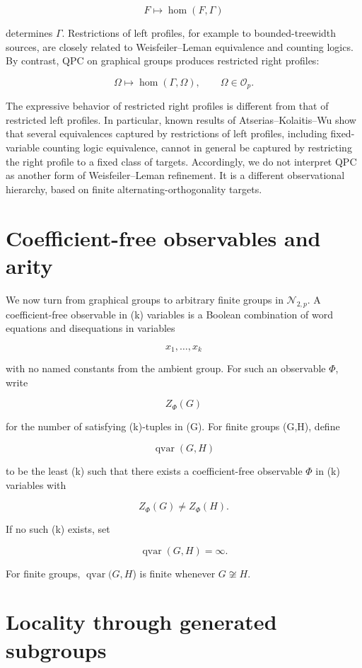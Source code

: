 \documentclass[11pt]{article}
\begin{document}
\[
F\mapsto \operatorname{hom}(F,\Gamma)
\]

determines $\Gamma$. Restrictions of left profiles, for example to bounded-treewidth sources, are closely related to Weisfeiler--Leman equivalence and counting logics. By contrast, QPC on graphical groups produces restricted right profiles:

\[
\Omega\mapsto \operatorname{hom}(\Gamma,\Omega),
\qquad
\Omega\in\mathcal O_p.
\]

The expressive behavior of restricted right profiles is different from that of restricted left profiles. In particular, known results of Atserias--Kolaitis--Wu show that several equivalences captured by restrictions of left profiles, including fixed-variable counting logic equivalence, cannot in general be captured by restricting the right profile to a fixed class of targets. Accordingly, we do not interpret QPC as another form of Weisfeiler--Leman refinement. It is a different observational hierarchy, based on finite alternating-orthogonality targets.

\section{Coefficient-free observables and arity}

We now turn from graphical groups to arbitrary finite groups in $\mathcal N_{2,p}$. A coefficient-free observable in (k) variables is a Boolean combination of word equations and disequations in variables

\[
x_1,\dots,x_k
\]

with no named constants from the ambient group. For such an observable $\Phi$, write

\[
Z_\Phi(G)
\]

for the number of satisfying (k)-tuples in (G). For finite groups (G,H), define

\[
\operatorname{qvar}(G,H)
\]

to be the least (k) such that there exists a coefficient-free observable $\Phi$ in (k) variables with

\[
Z_\Phi(G)\ne Z_\Phi(H).
\]

If no such (k) exists, set

\[
\operatorname{qvar}(G,H)=\infty.
\]

For finite groups, $\operatorname{qvar}(G,H$) is finite whenever $G\not\cong H$.

\section{Locality through generated subgroups}
\end{document}
